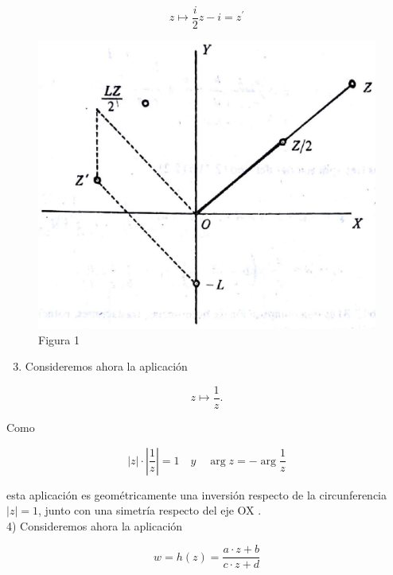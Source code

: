 \documentclass[10pt]{article}
\theoremstyle{plain}
\theoremstyle{definition}
\theoremstyle{remark}
\begin{document}
$$
z \mapsto \frac{i}{2} z-i=z^{\prime}
$$

\begin{figure}[h]
\begin{center}
  \includegraphics[width=\textwidth]{2025_09_05_adecef5eb2053bc129b5g-012}
\captionsetup{labelformat=empty}
\caption{Figura 1}
\end{center}
\end{figure}

\begin{enumerate}
  \setcounter{enumi}{2}
  \item Consideremos ahora la aplicación
\end{enumerate}


\begin{equation*}
z \mapsto \frac{1}{z} . \tag{2-2}
\end{equation*}


Como

$$
|z| \cdot\left|\frac{1}{z}\right|=1 \quad y \quad \arg z=-\arg \frac{1}{z}
$$

esta aplicación es geométricamente una inversión respecto de la circunferencia $|z|=1$, junto con una simetría respecto del eje OX .\\
4) Consideremos ahora la aplicación


\begin{equation*}
w=h(z)=\frac{a \cdot z+b}{c \cdot z+d} \tag{2-3}
\end{equation*}
\end{document}
